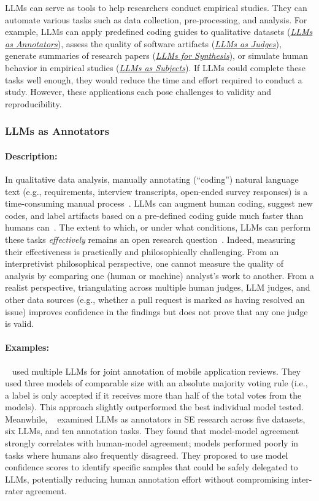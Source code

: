 \documentclass[smallextended]{svjour3}
\newcommand{\annotators}{\hyperref[sec:llms-as-annotators]{\emph{LLMs as Annotators}}\xspace}
\newcommand{\judges}{\hyperref[sec:llms-as-judges]{\emph{LLMs as Judges}}\xspace}
\newcommand{\synthesis}{\hyperref[sec:llms-for-synthesis]{\emph{LLMs for Synthesis}}\xspace}
\newcommand{\subjects}{\hyperref[sec:llms-as-subjects]{\emph{LLMs as Subjects}}\xspace}
\newcommand{\annotators}{\href{/study-types\#llms-as-annotators}{\emph{LLMs as Annotators}}\xspace}
\newcommand{\judges}{\href{/study-types\#llms-as-judges}{\emph{LLMs as Judges}}\xspace}
\newcommand{\synthesis}{\href{/study-types\#llms-for-synthesis}{\emph{LLMs for Synthesis}}\xspace}
\newcommand{\subjects}{\href{/study-types\#llms-as-subjects}{\emph{LLMs as Subjects}}\xspace}
\newcommand{\studytypesubsection}[1]{\subsubsection{#1}}
\newcommand{\studytypeparagraph}[1]{\paragraph{\bfseries #1:}}
\newcommand{\studytypesubsection}[1]{\subsection{#1}}
\newcommand{\studytypeparagraph}[1]{\subsubsection{#1}}
\begin{document}
LLMs can serve as tools to help researchers conduct empirical studies.
They can automate various tasks such as data collection, pre-processing, and analysis.
For example, LLMs can apply predefined coding guides to qualitative datasets (\annotators), assess the quality of software artifacts (\judges), generate summaries of research papers (\synthesis), or simulate human behavior in empirical studies (\subjects). If LLMs could complete these tasks well enough, they would reduce the time and effort required to conduct a study. However, these applications each pose challenges to validity and reproducibility.
 
\studytypesubsection{LLMs as Annotators}
\label{sec:llms-as-annotators}

\studytypeparagraph{Description}
In qualitative data analysis, manually annotating (``coding'') natural language text (e.g., requirements, interview transcripts, open-ended survey responses) is a time-consuming manual process~\cite{DBLP:journals/ase/BanoHZT24}. LLMs can augment human coding, suggest new codes, and label artifacts based on a pre-defined coding guide much faster than humans can~\cite{DBLP:conf/chi/HeHDRH24}.
The extent to which, or under what conditions, LLMs can perform these tasks \textit{effectively} remains an open research question~\cite{DBLP:conf/msr/AhmedDTP25}. Indeed, measuring their effectiveness is practically and philosophically challenging. From an interpretivist philosophical perspective, one cannot measure the quality of analysis by comparing one (human or machine) analyst's work to another. From a realist perspective, triangulating across multiple human judges, LLM judges, and other data sources (e.g., whether a pull request is marked as having resolved an issue) improves confidence in the findings but does not prove that any one judge is valid.

\studytypeparagraph{Examples}
\citeauthor{Huang2023Enhancing}~\cite{Huang2023Enhancing} used multiple LLMs for joint annotation of mobile application reviews. 
They used three models of comparable size with an absolute majority voting rule (i.e., a label is only accepted if it receives more than half of the total votes from the models). This approach slightly outperformed the best individual model tested. 
Meanwhile, \citeauthor{DBLP:conf/msr/AhmedDTP25}~\cite{DBLP:conf/msr/AhmedDTP25} examined LLMs as annotators in SE research across five datasets, six LLMs, and ten annotation tasks.
They found that model-model agreement strongly correlates with human-model agreement; models performed poorly in tasks where humans also frequently disagreed. They proposed to use model confidence scores to identify specific samples that could be safely delegated to LLMs, potentially reducing human annotation effort without compromising inter-rater agreement.
 
\end{document}
